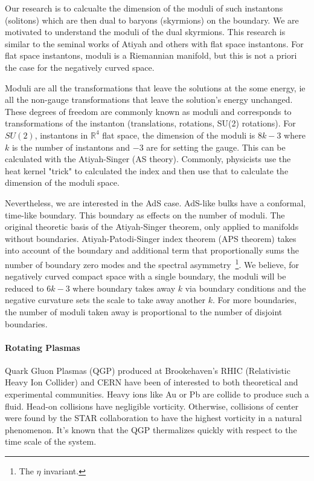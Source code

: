 \documentclass[12pt]{article}
\begin{document}
Our research is to calcualte the dimension of the moduli of such instantons (solitons) which are then dual to baryons (skyrmions) on the boundary.
%
We are motivated to understand the moduli of the dual skyrmions.
%
This research is similar to the seminal works of Atiyah and others with flat space instantons.
%
For flat space instantons, moduli is a Riemannian manifold, but this is not a priori the case for the negatively curved space.

Moduli are all the transformations that leave the solutions at the some energy, ie all the non-gauge transformations that leave the solution's energy unchanged.
%
These degrees of freedom are commonly known as moduli and corresponds to transformations of the instanton (translations, rotations, SU(2) rotations).
%
For $SU(2)$, instantons in $\mathds{R}^4$ flat space, the dimension of the moduli is $8k - 3$ where $k$ is the number of instantons and $-3$ are for setting the gauge.
%
This can be calculated with the Atiyah-Singer (AS theory).
%
Commonly, physicists use the heat kernel "trick" to calculated the index and then use that to calculate the dimension of the moduli space.

Nevertheless, we are interested in the AdS case. 
%
AdS-like bulks have a conformal, time-like boundary.
%
This boundary as effects on the number of moduli.
%
The original theoretic basis of the Atiyah-Singer theorem, only applied to manifolds without boundaries. 
%
Atiyah-Patodi-Singer index theorem (APS theorem) takes into account of the boundary and additional term that proportionally sums the number of boundary zero modes and the spectral asymmetry\
  \footnote{The $\eta$ invariant.}.
We believe, for negatively curved compact space with a single boundary, the moduli will be reduced to $6k - 3$ where boundary takes away $k$ via boundary conditions and the negative curvature sets the scale to take away another $k$.
%
For more boundaries, the number of moduli taken away is proportional to the number of disjoint boundaries.

\paragraph{Rotating Plasmas}

Quark Gluon Plasmas (QGP) produced at Brookehaven's RHIC (Relativistic Heavy Ion Collider) and CERN have been of interested to both theoretical and experimental communities.
%
Heavy ions like Au or Pb are collide to produce such a fluid.
%
Head-on collisions have negligible vorticity.
%
Otherwise, collisions of center were found by the STAR collaboration to have the highest vorticity in a natural phenomenon.
%
It's known that the QGP thermalizes quickly with respect to the time scale of the system.
\end{document}
